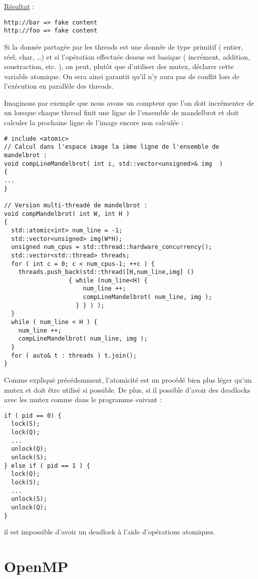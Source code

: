 \documentclass[fleqn,11pt]{article}
\begin{document}
\underline{Résultat} :

\begin{verbatim}
http://bar => fake content
http://foo => fake content
\end{verbatim}

Si la donnée partagée par les threads est une donnée de type primitif ( entier, réel, char, \ldots ) et si l'opération
effectuée dessus est basique ( incrément, addition, soustraction, etc. ), on peut, plutôt que d'utiliser des mutex, déclarer
cette variable atomique. On sera ainsi garantit qu'il n'y aura pas de conflit lors de l'exécution en parallèle des threads.

Imaginons par exemple que nous avons un compteur que l'on doit incrémenter de un lorsque chaque thread finit une ligne de l'ensemble de mandelbrot
et doit calculer la prochaine ligne de l'image encore non calculée :

\begin{lstlisting}
# include <atomic>
// Calcul dans l'espace image la ième ligne de l'ensemble de mandelbrot :
void compLineMandelbrot( int i, std::vector<unsigned>& img  )
{
...
}

// Version multi-threadé de mandelbrot :
void compMandelbrot( int W, int H )
{
  std::atomic<int> num_line = -1;
  std::vector<unsigned> img(W*H);
  unsigned num_cpus = std::thread::hardware_concurrency();
  std::vector<std::thread> threads;
  for ( int c = 0; c < num_cpus-1; ++c ) {
    threads.push_back(std::thread([H,num_line,img] () 
				  { while (num_line<H) { 
				      num_line ++;
				      compLineMandelbrot( num_line, img );
				    } } ) );
  }
  while ( num_line < H ) {
    num_line ++;
    compLineMandelbrot( num_line, img );
  }
  for ( auto& t : threads ) t.join();
}
\end{lstlisting}

Comme expliqué précédemment, l'atomicité est un procédé bien plus léger qu'un mutex et doit être utilisé si possible.
De plus, si il possible d'avoir des deadlocks avec les mutex comme dans le programme suivant :
\begin{lstlisting}
if ( pid == 0) {
  lock(S);
  lock(Q);
  ...
  unlock(Q);
  unlock(S);
} else if ( pid == 1 ) {
  lock(Q);
  lock(S);
  ...
  unlock(S);
  unlock(Q);
}
\end{lstlisting}

il est impossible d'avoir un deadlock à l'aide d'opérations atomiques.

\section{OpenMP}
\end{document}
